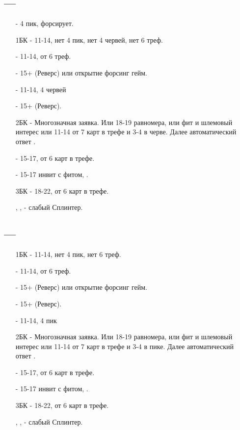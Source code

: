 \documentclass{article}
\begin{document}
\subsection{ --- }
\begin{enumerate}
    \item[\sp{1}] - 4 пик, форсирует.
    \item[1БК] - 11-14, нет 4 пик, нет 4 червей, нет 6 треф.
    \item[\cl{2}] - 11-14, от 6 треф.
    \item[\di{2}] - 15+  (Реверс) или открытие форсинг гейм.
    \item[\he{2}] - 11-14, 4 червей
    \item[\sp{2}] - 15+  (Реверс).
    \item[2БК] - Многозначная заявка. Или 18-19 равномера, или фит и шлемовый интерес или 11-14 от 7 карт в трефе и 3-4 в черве. Далее автоматический ответ .
    \item[\cl{3}] - 15-17, от 6 карт в трефе.
    \item[\he{3}] - 15-17 инвит с фитом, .
    \item[3БК] - 18-22, от 6 карт в трефе.
    \item[\sp{3}, \cl{4}, \di{4}] - слабый Сплинтер.
\end{enumerate}
\subsection{ --- }
\begin{enumerate}
    \item[1БК] - 11-14, нет 4 пик, нет 6 треф.
    \item[\cl{2}] - 11-14, от 6 треф.
    \item[\di{2}] - 15+  (Реверс) или открытие форсинг гейм.
    \item[\he{2}] - 15+  (Реверс).
    \item[\sp{2}] - 11-14, 4 пик
    \item[2БК] - Многозначная заявка. Или 18-19 равномера, или фит и шлемовый интерес или 11-14 от 7 карт в трефе и 3-4 в пике. Далее автоматический ответ .
    \item[\cl{3}] - 15-17, от 6 карт в трефе.
    \item[\sp{3}] - 15-17 инвит с фитом, .
    \item[3БК] - 18-22, от 6 карт в трефе.
    \item[\cl{4}, \di{4}, \he{4}] - слабый Сплинтер.
\end{enumerate}
\end{document}
